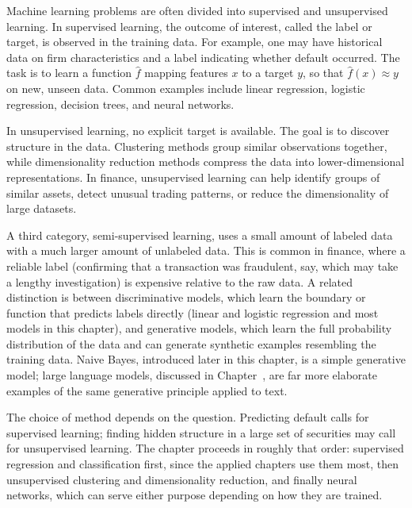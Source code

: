 \documentclass[../ai_in_finance]{subfiles}
\begin{document}
Machine learning problems are often divided into supervised and unsupervised learning. In supervised learning, the outcome of interest, called the label or target, is observed in the training data. For example, one may have historical data on firm characteristics and a label indicating whether default occurred. The task is to learn a function $\hat f$ mapping features $x$ to a target $y$, so that $\hat f(x) \approx y$ on new, unseen data. Common examples include linear regression, logistic regression, decision trees, and neural networks.

In unsupervised learning, no explicit target is available. The goal is to discover structure in the data. Clustering methods group similar observations together, while dimensionality reduction methods compress the data into lower-dimensional representations. In finance, unsupervised learning can help identify groups of similar assets, detect unusual trading patterns, or reduce the dimensionality of large datasets.

A third category, semi-supervised learning, uses a small amount of labeled data with a much larger amount of unlabeled data. This is common in finance, where a reliable label (confirming that a transaction was fraudulent, say, which may take a lengthy investigation) is expensive relative to the raw data. A related distinction is between discriminative models, which learn the boundary or function that predicts labels directly (linear and logistic regression and most models in this chapter), and generative models, which learn the full probability distribution of the data and can generate synthetic examples resembling the training data. Naive Bayes, introduced later in this chapter, is a simple generative model; large language models, discussed in Chapter~, are far more elaborate examples of the same generative principle applied to text.

The choice of method depends on the question. Predicting default calls for supervised learning; finding hidden structure in a large set of securities may call for unsupervised learning. The chapter proceeds in roughly that order: supervised regression and classification first, since the applied chapters use them most, then unsupervised clustering and dimensionality reduction, and finally neural networks, which can serve either purpose depending on how they are trained.
\end{document}
